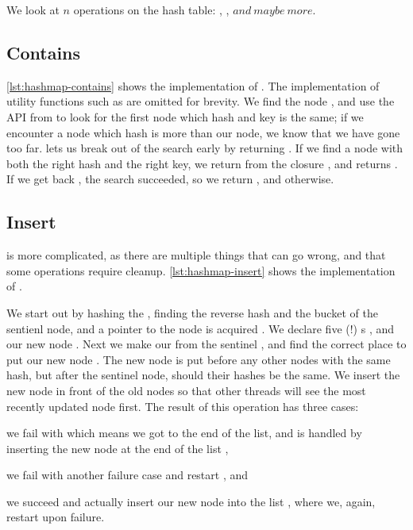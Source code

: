 We look at $n$ operations on the hash table: , , $and\ maybe\ more$.

\subsection{Contains}

\cref{lst:hashmap-contains} shows the implementation of . The
implementation of utility functions such as  are omitted for brevity.  We
find the  node , and use the  API from 
 to look for the first node which hash and key is the same; if we encounter a node
which hash is more than our node, we know that we have gone too far. 
lets us break out of the search early by returning  . If we find a node
with both the right hash and the right key, we return  from the
closure , and  returns . If we get back , the
search succeeded, so we return , and  otherwise.



\subsection{Insert}
 is more complicated, as there are multiple things that can go wrong, and
that some operations require cleanup. \cref{lst:hashmap-insert} shows the implementation of
.



We start out by hashing the , finding the reverse hash  and the bucket of
the sentienl node, and a pointer to the node is acquired . We declare five (!)
s , and  our new node .
Next we make our  from the sentinel , and find the correct place to put
our new node . The new node is put before any other nodes with the same hash, but
after the sentinel node, should their hashes be the same. We insert the new node in front of the
old nodes so that other threads will see the most recently updated node first. The result of this
operation has three cases:
\begin{enumerate*}[1) ]
  \item we fail with  which means we got to the end of the list, and is handled by
    inserting the new node at the end of the list  ,
  \item we fail with another failure case and restart , and
  \item we succeed and actually insert our new node into the list , where we, again,
    restart upon failure.
\end{enumerate*}

